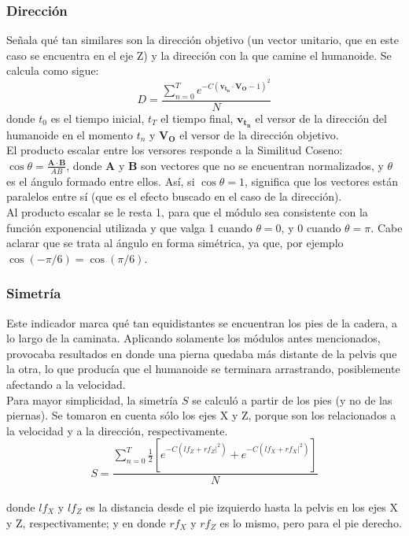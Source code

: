 \documentclass{article}
\begin{document}

\subsubsection{Direcci\'on}
\label{direccion}
Se\~nala qu\'e tan similares son la direcci\'on objetivo (un vector unitario, que en este caso se encuentra en el eje Z) y la direcci\'on con la que camine el humanoide. Se calcula como sigue:
\begin{equation}
 D = \frac{\sum_{n=0}^{T} {e^{-C( \boldsymbol{v_{t_{n}}} \cdot \boldsymbol{V_{O} } -1)^2 } } }{N}
\end{equation}
donde $t_{0}$ es el tiempo inicial, $t_{T}$ el tiempo final, $\boldsymbol{v_{t_{n}}}$ el versor de la direcci\'on del humanoide en el momento $t_{n}$ y $\boldsymbol{V_{O}}$ el versor de la direcci\'on objetivo.
\\ El producto escalar entre los versores responde a la Similitud Coseno: $\cos \theta = \frac{\boldsymbol{A} \cdot \boldsymbol{B} } {A B } $, donde \textbf{A} y \textbf{B} son vectores que no se encuentran normalizados, y $\theta$ es el \'angulo formado entre ellos. As\'i,  si $\cos \theta=1$, significa que los vectores est\'an paralelos entre s\'i (que es el efecto buscado en el caso de la direcci\'on). 
\\ Al producto escalar se le resta 1, para que el m\'odulo sea consistente con la funci\'on exponencial utilizada y que valga 1 cuando $\theta = 0$, y  0 cuando $\theta = \pi$. Cabe aclarar que se trata al \'angulo en forma sim\'etrica, ya que, por ejemplo $\cos(-\pi/6) = \cos(\pi/6)$.

\subsubsection{Simetr\'ia}
\label{simetria}
Este indicador marca qu\'e tan equidistantes se encuentran los pies de la cadera, a lo largo de la caminata. Aplicando solamente los m\'odulos antes mencionados, provocaba resultados en donde una pierna quedaba m\'as distante de la pelvis que la otra, lo que produc\'ia que el humanoide se terminara arrastrando, posiblemente afectando a la velocidad.\\
Para mayor simplicidad, la simetr\'ia $S$ se calcul\'o a partir de los pies (y no de las piernas). Se tomaron en cuenta s\'olo los ejes X y Z, porque son los relacionados a la velocidad y a la direcci\'on, respectivamente.
\begin{equation}
 S = \frac{\sum_{n=0}^{T} { \frac{1}{2} [e^{-C( lf_{Z} + rf_{Z}| ^2) } + e^{-C( lf_{X} + rf_{X}| ^2) }]  } } {N}
\end{equation}
\\ donde $lf_{X} $ y $lf_{Z} $ es la distancia desde el pie izquierdo hasta la pelvis en los ejes X y Z, respectivamente; y  en donde $rf_{X} $ y $rf_{Z} $ es lo mismo, pero para el pie derecho. 
\end{document}

